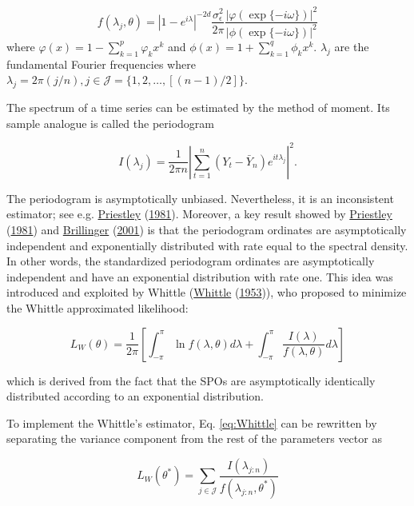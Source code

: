 \documentclass[
  11pt,
]{article}
\begin{document}
\[
f(\lambda_j, \theta)=\left|1-e^{i \lambda}\right|^{-2 d}\frac{\sigma_{\epsilon}^{2}}{2 \pi} \frac{|\varphi(\exp \{-i \omega\})|^{2}}{|\phi(\exp \{-i \omega\})|^{2}}
\] where \(\varphi(x)=1-\sum_{k=1}^{p} \varphi_{k} x^{k}\) and
\(\phi(x)=1+\sum_{k=1}^{q} \phi_{k} x^{k}\). \(\lambda_j\) are the
fundamental Fourier frequencies where
\(\lambda_j=2 \pi(j / n), j \in \mathcal{J}=\{1,2, \ldots,[(n-1) / 2]\}\).

The spectrum of a time series can be estimated by the method of moment.
Its sample analogue is called the periodogram

\[I\left(\lambda_{j}\right)=\frac{1}{2 \pi n}\left|\sum_{t=1}^{n}\left(Y_{t}-\bar{Y}_{n}\right) e^{i t \lambda_{j}}\right|^{2}.\]

The periodogram is asymptotically unbiased. Nevertheless, it is an
inconsistent estimator; see e.g.
\protect\hyperlink{ref-priestley1981spectral}{Priestley}
(\protect\hyperlink{ref-priestley1981spectral}{1981}). Moreover, a key
result showed by
\protect\hyperlink{ref-priestley1981spectral}{Priestley}
(\protect\hyperlink{ref-priestley1981spectral}{1981}) and
\protect\hyperlink{ref-brillinger2001time}{Brillinger}
(\protect\hyperlink{ref-brillinger2001time}{2001}) is that the
periodogram ordinates are asymptotically independent and exponentially
distributed with rate equal to the spectral density. In other words, the
standardized periodogram ordinates are asymptotically independent and
have an exponential distribution with rate one. This idea was introduced
and exploited by Whittle
(\protect\hyperlink{ref-whittle1953estimation}{Whittle}
(\protect\hyperlink{ref-whittle1953estimation}{1953})), who proposed to
minimize the Whittle approximated likelihood:

\begin{equation}
L_{W}(\theta)=\frac{1}{2 \pi}\left[\int_{-\pi}^{\pi} \ln f(\lambda, \theta) d \lambda+\int_{-\pi}^{\pi} \frac{I(\lambda)}{f(\lambda, \theta)} d \lambda\right]
\label{eq:Whittle}
\end{equation}

which is derived from the fact that the SPOs are asymptotically
identically distributed according to an exponential distribution.

To implement the Whittle's estimator, Eq. \ref{eq:Whittle} can be
rewritten by separating the variance component from the rest of the
parameters vector as

\begin{equation}
L_{W}\left(\theta^{*}\right)=\sum_{j \in \mathcal{J}} \frac{I\left(\lambda_{j: n}\right)}{f\left(\lambda_{j: n}, \theta^{*}\right)}
\end{equation}
\end{document}
